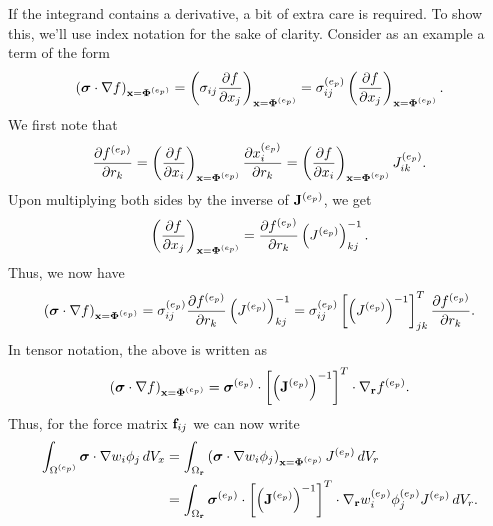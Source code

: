 \documentclass[11pt]{report}
\begin{document}
If the integrand contains a derivative, a bit of extra care is required. To show this, we'll use index notation for the sake of clarity. Consider as an example a term of the form
\begin{equation}
    \left ( \bm \sigma \cdot \nabla f \right )_{\mathbf{x}=\bm \Phi^{(e_p)}}= \left ( \sigma_{ij} \frac{\partial f}{\partial x_j} \right )_{\mathbf{x} = \bm \Phi^{(e_p)}}= \sigma_{ij}^{(e_p)} \left ( \frac{\partial f}{\partial x_j} \right )_{\mathbf{x} = \bm \Phi^{(e_p)}}.
\end{equation}
We first note that
\begin{equation}
    \frac{\partial f^{(e_p)}}{\partial r_k} = \left ( \frac{\partial f}{\partial x_i} \right )_{\mathbf{x} = \bm \Phi^{(e_p)}} \frac{\partial x^{(e_p)}_i}{\partial r_k} = \left ( \frac{\partial f}{\partial x_i} \right )_{\mathbf{x} = \bm \Phi^{(e_p)}} J^{(e_p)}_{ik}.
\end{equation}
Upon multiplying both sides by the inverse of $\mathbf{J}^{(e_p)}$, we get
\begin{equation}
    \left ( \frac{\partial f}{\partial x_j} \right )_{\mathbf{x} = \bm \Phi^{(e_p)}} = \frac{\partial f^{(e_p)}}{\partial r_k} \left( J^{(e_p)} \right)^{-1}_{kj}.
\end{equation}
Thus, we now have
\begin{equation}
    \left ( \bm \sigma \cdot \nabla f \right )_{\mathbf{x}=\bm \Phi^{(e_p)}} = \sigma^{(e_p)}_{ij}\frac{\partial f^{(e_p)}}{\partial r_k} \left( J^{(e_p)} \right)^{-1}_{kj} = \sigma^{(e_p)}_{ij} \left[ \left( J^{(e_p)} \right)^{-1} \right]^T_{jk} \frac{\partial f^{(e_p)}}{\partial r_k}.
\end{equation}
In tensor notation, the above is written as
\begin{equation}
    \left ( \bm \sigma \cdot \nabla f \right )_{\mathbf{x}=\bm \Phi^{(e_p)}} = \bm \sigma^{(e_p)} \cdot \left[ \left( \mathbf{J}^{(e_p)} \right)^{-1} \right]^T \cdot \nabla_{\mathbf{r}} f^{(e_p)}.
\end{equation}
Thus, for the force matrix $\mathbf{f}_{ij}$ we can now write
\begin{align}
    \int_{\Omega^{(e_p)}} \bm \sigma \cdot \nabla w_i \phi_j \, dV_x &= \int_{\Omega_{\mathbf{r}}} \left ( \bm \sigma \cdot \nabla w_i \phi_j \right )_{\mathbf{x}=\bm \Phi^{(e_p)}} J^{(e_p)} \, dV_r \nonumber \\
    &= \int_{\Omega_{\mathbf{r}}} \bm \sigma^{(e_p)} \cdot \left[ \left( \mathbf{J}^{(e_p)} \right)^{-1} \right]^T  \cdot \nabla_{\mathbf{r}} w^{(e_p)}_i \phi^{(e_p)}_j J^{(e_p)} \, dV_r.
\end{align}
\end{document}
